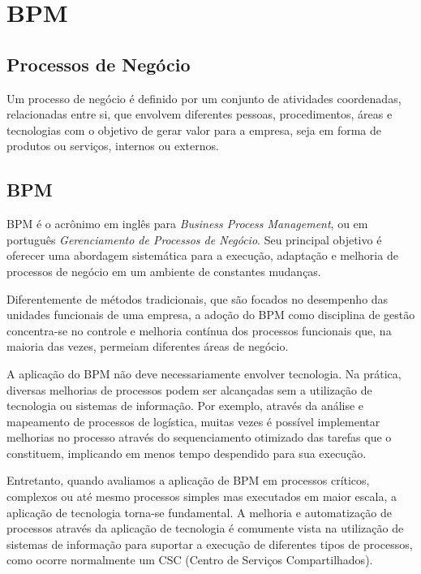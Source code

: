 \chapter{BPM}\label{chp:bpm}

\section{Processos de Negócio}\label{sec:bpm-processos}
Um processo de negócio é definido por um conjunto de atividades coordenadas, relacionadas entre si, que envolvem diferentes pessoas, procedimentos, áreas e tecnologias com o objetivo de gerar valor para a empresa, seja em forma de produtos ou serviços, internos ou externos.

\section{BPM}\label{sec:bpm-bpm}
BPM\cite{bpm} é o acrônimo em inglês para \textit{Business Process Management}, ou em português \textit{Gerenciamento de Processos de Negócio}. Seu principal objetivo é oferecer uma abordagem sistemática para a execução, adaptação e melhoria de processos de negócio em um ambiente de constantes mudanças. 

Diferentemente de métodos tradicionais, que são focados no desempenho das unidades funcionais de uma empresa, a adoção do BPM como disciplina de gestão concentra-se no controle e melhoria contínua dos processos funcionais que, na maioria das vezes, permeiam diferentes áreas de negócio.

A aplicação do BPM não deve necessariamente envolver tecnologia. Na prática, diversas melhorias de processos podem ser alcançadas sem a utilização de tecnologia ou sistemas de informação. Por exemplo, através da análise e mapeamento de processos de logística, muitas vezes é possível implementar melhorias no processo através do sequenciamento otimizado das tarefas que o constituem, implicando em menos tempo despendido para sua execução.

Entretanto, quando avaliamos a aplicação de BPM em processos críticos, complexos ou até mesmo processos simples mas executados em maior escala, a aplicação de tecnologia torna-se fundamental. A melhoria e automatização de processos através da aplicação de tecnologia é comumente vista na utilização de sistemas de informação para suportar a execução de diferentes tipos de processos, como ocorre normalmente um CSC\cite{csc} (Centro de Serviços Compartilhados).



